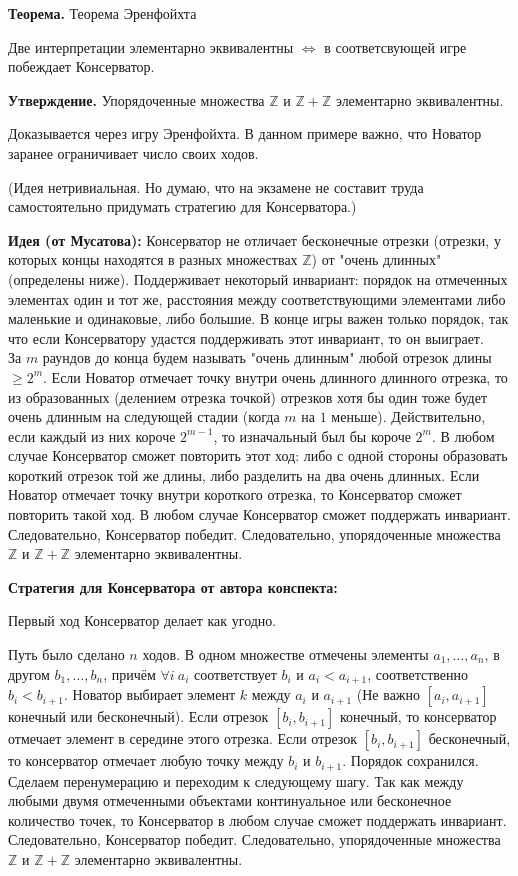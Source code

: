 \textbf{Теорема.} Теорема Эренфойхта 

Две интерпретации элементарно эквивалентны $\Leftrightarrow$ в соответсвующей игре побеждает Консерватор.

\textbf{Утверждение.} Упорядоченные множества $\mathbb{Z}$ и $\mathbb{Z} + \mathbb{Z}$  элементарно эквивалентны.

Доказывается через игру Эренфойхта. В данном примере важно, что Новатор заранее ограничивает число своих ходов.

(Идея нетривиальная. Но думаю, что на экзамене не составит труда самостоятельно придумать стратегию для Консерватора.)

\textbf{Идея (от Мусатова):}  Консерватор не отличает бесконечные отрезки (отрезки, у которых концы находятся в разных множествах $\mathbb{Z}$) от "очень длинных" (определены ниже). Поддерживает некоторый инвариант: порядок на отмеченных элементах один и тот же, расстояния между соответствующими элементами либо маленькие и одинаковые, либо большие. В конце игры важен только порядок, так что если Консерватору удастся поддерживать этот инвариант, то он выиграет.\\
За $m$ раундов до конца будем называть "очень длинным" любой отрезок длины $\geq 2^m$. Если Новатор отмечает точку внутри очень длинного длинного отрезка, то из образованных (делением отрезка точкой) отрезков хотя бы один тоже будет очень длинным на следующей стадии (когда $m$ на $1$ меньше). Действительно, если каждый из них короче $2^{m-1}$, то изначальный был бы короче $2^m$. В любом случае Консерватор сможет повторить этот ход: либо с одной стороны образовать короткий отрезок той же длины, либо разделить на два очень длинных. Если Новатор отмечает точку внутри короткого отрезка, то Консерватор сможет повторить такой ход. В любом случае Консерватор сможет поддержать инвариант. Следовательно, Консерватор победит. Следовательно, упорядоченные множества $\mathbb{Z}$ и $\mathbb{Z} + \mathbb{Z}$ элементарно эквивалентны.

\textbf{Стратегия для Консерватора от автора конспекта:} 

Первый ход Консерватор делает как угодно.

Путь было сделано $n$ ходов. В одном множестве отмечены элементы $a_1, \ldots, a_n$, в другом $b_1, \ldots, b_n$, причём $\forall i \ a_i$ соответствует $b_i$ и $a_i < a_{i + 1}$, соответственно $b_i < b_{i + 1}$. Новатор выбирает элемент $k$ между $a_i$ и $a_{i + 1}$ (Не важно $[a_i, a_{i + 1}]$ конечный или бесконечный). Если отрезок $[b_i, b_{i + 1}]$ конечный, то консерватор отмечает элемент в середине этого отрезка. Если отрезок $[b_i, b_{i + 1}]$ бесконечный, то консерватор отмечает любую точку между $b_i$ и $b_{i + 1}$. Порядок сохранился. Сделаем перенумерацию и переходим к следующему шагу. Так как между любыми двумя отмеченными объектами континуальное или бесконечное количество точек, то Консерватор в любом случае сможет поддержать инвариант. Следовательно, Консерватор победит. Следовательно, упорядоченные множества $\mathbb{Z}$ и $\mathbb{Z} + \mathbb{Z}$ элементарно эквивалентны. 